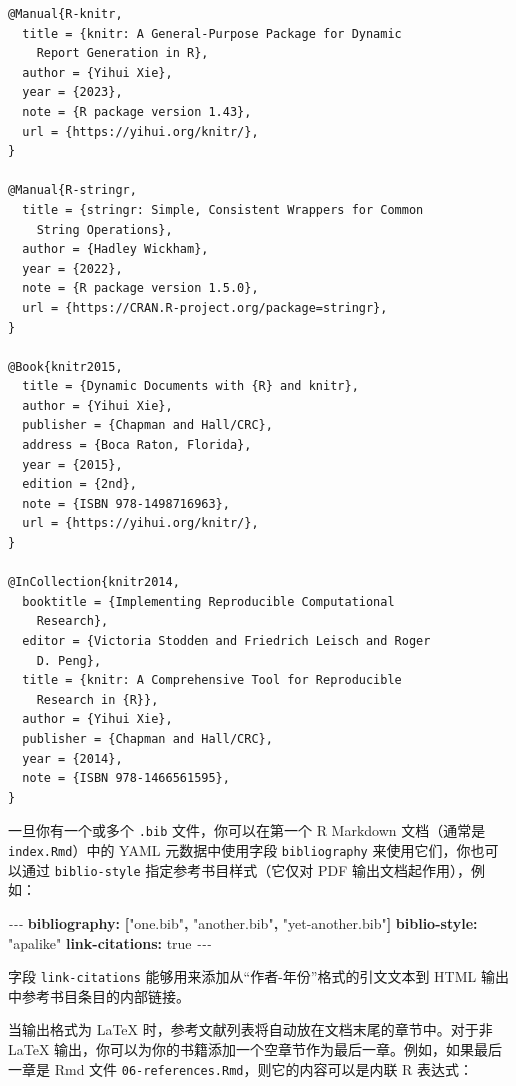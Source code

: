 \documentclass[
  12pt,
]{krantz}
\newenvironment{Shaded}{\begin{snugshade}}{\end{snugshade}}
\newcommand{\AttributeTok}[1]{\textcolor[rgb]{0.13,0.29,0.53}{#1}}
\newcommand{\CharTok}[1]{\textcolor[rgb]{0.31,0.60,0.02}{#1}}
\newcommand{\FunctionTok}[1]{\textcolor[rgb]{0.13,0.29,0.53}{\textbf{#1}}}
\newcommand{\KeywordTok}[1]{\textcolor[rgb]{0.13,0.29,0.53}{\textbf{#1}}}
\newcommand{\PreprocessorTok}[1]{\textcolor[rgb]{0.56,0.35,0.01}{\textit{#1}}}
\newcommand{\StringTok}[1]{\textcolor[rgb]{0.31,0.60,0.02}{#1}}
\theoremstyle{definition}
\theoremstyle{definition}
\theoremstyle{definition}
\theoremstyle{definition}
\theoremstyle{remark}
\begin{document}
\begin{verbatim}
@Manual{R-knitr,
  title = {knitr: A General-Purpose Package for Dynamic
    Report Generation in R},
  author = {Yihui Xie},
  year = {2023},
  note = {R package version 1.43},
  url = {https://yihui.org/knitr/},
}

@Manual{R-stringr,
  title = {stringr: Simple, Consistent Wrappers for Common
    String Operations},
  author = {Hadley Wickham},
  year = {2022},
  note = {R package version 1.5.0},
  url = {https://CRAN.R-project.org/package=stringr},
}

@Book{knitr2015,
  title = {Dynamic Documents with {R} and knitr},
  author = {Yihui Xie},
  publisher = {Chapman and Hall/CRC},
  address = {Boca Raton, Florida},
  year = {2015},
  edition = {2nd},
  note = {ISBN 978-1498716963},
  url = {https://yihui.org/knitr/},
}

@InCollection{knitr2014,
  booktitle = {Implementing Reproducible Computational
    Research},
  editor = {Victoria Stodden and Friedrich Leisch and Roger
    D. Peng},
  title = {knitr: A Comprehensive Tool for Reproducible
    Research in {R}},
  author = {Yihui Xie},
  publisher = {Chapman and Hall/CRC},
  year = {2014},
  note = {ISBN 978-1466561595},
}
\end{verbatim}

一旦你有一个或多个 \texttt{.bib} 文件，你可以在第一个 R Markdown 文档（通常是 \texttt{index.Rmd}）中的 YAML 元数据中使用字段 \texttt{bibliography} 来使用它们，你也可以通过 \texttt{biblio-style} 指定参考书目样式（它仅对 PDF 输出文档起作用），例如：

\begin{Shaded}
\begin{Highlighting}[]
\PreprocessorTok{{-}{-}{-}}
\FunctionTok{bibliography}\KeywordTok{:}\AttributeTok{ }\KeywordTok{[}\StringTok{"one.bib"}\KeywordTok{,}\AttributeTok{ }\StringTok{"another.bib"}\KeywordTok{,}\AttributeTok{ }\StringTok{"yet{-}another.bib"}\KeywordTok{]}
\FunctionTok{biblio{-}style}\KeywordTok{:}\AttributeTok{ }\StringTok{"apalike"}
\FunctionTok{link{-}citations}\KeywordTok{:}\AttributeTok{ }\CharTok{true}
\PreprocessorTok{{-}{-}{-}}
\end{Highlighting}
\end{Shaded}

字段 \texttt{link-citations} 能够用来添加从``作者-年份''格式的引文文本到 HTML 输出中参考书目条目的内部链接。

当输出格式为 LaTeX 时，参考文献列表将自动放在文档末尾的章节中。对于非 LaTeX 输出，你可以为你的书籍添加一个空章节作为最后一章。例如，如果最后一章是 Rmd 文件 \texttt{06-references.Rmd}，则它的内容可以是内联 R 表达式：
\end{document}

